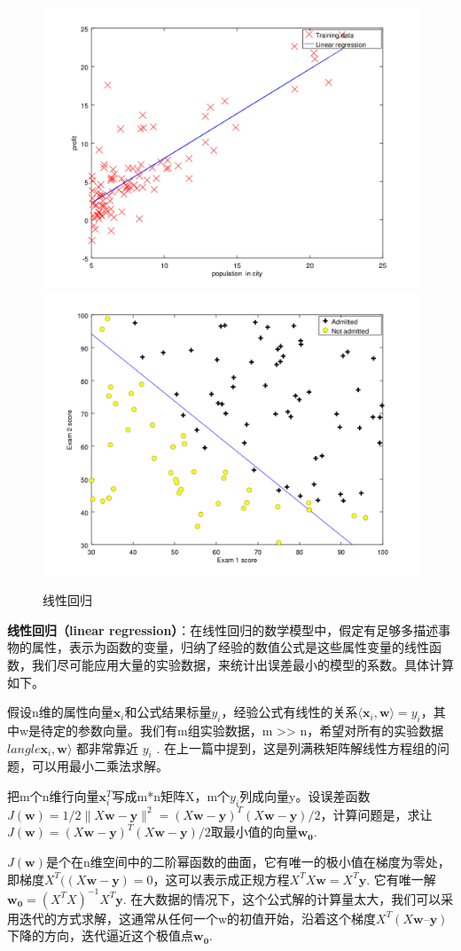 \begin{figure}[t]
	\centering
	\includegraphics[width=0.49\linewidth]{pic/161238petg2epyqhslbulz.png}
	\includegraphics[width=0.49\linewidth]{pic/161239i3870x2cvwmclc09.png}
	\caption{线性回归}
	\label{fig:161238petg2epyqhslbulz}
\end{figure}

\textbf{线性回归（linear regression）}：在线性回归的数学模型中，假定有足够多描述事物的属性，表示为函数的变量，归纳了经验的数值公式是这些属性变量的线性函数，我们尽可能应用大量的实验数据，来统计出误差最小的模型的系数。具体计算如下。

假设n维的属性向量$ \bm{x}_{i} $和公式结果标量$ y_{i} $，经验公式有线性的关系$ \langle \bm{x}_i, \bm{w}\rangle = y_{i}$，其中w是待定的参数向量。我们有m组实验数据，m >> n，希望对所有的实验数据 $langle \bm{x}_i, \bm{w}\rangle$ 都非常靠近 $  y_i $ . 在上一篇中提到，这是列满秩矩阵解线性方程组的问题，可以用最小二乘法求解。

把m个n维行向量$ \bm{x}_i^T $写成m*n矩阵X，m个$ y_i $列成向量y。设误差函数$ J(\bm{w}) =1/2\|X\bm{w} - \bm{y}\|^2 = (X\bm{w} - \bm{y})^T (X\bm{w} - \bm{y})/2 $，计算问题是，求让$ J(\bm{w}) = (X\bm{w} - \bm{y})^T (X\bm{w} - \bm{y})/2 $取最小值的向量$ \bm{w_0} $.  

$ J(\bm{w})  $是个在n维空间中的二阶幂函数的曲面，它有唯一的极小值在梯度为零处，即梯度$ X^T ((X\bm{w} - \bm{y}) = 0 $，这可以表示成正规方程$ X^TX\bm{w} =X^T\bm{y} $. 它有唯一解$ \bm{w_0} =(X^TX)^{-1}X^T\bm{y} $.  在大数据的情况下，这个公式解的计算量太大，我们可以采用迭代的方式求解，这通常从任何一个w的初值开始，沿着这个梯度$ X^T ( X\bm{w} – \bm{y}) $下降的方向，迭代逼近这个极值点$ \bm{w_0} $.

